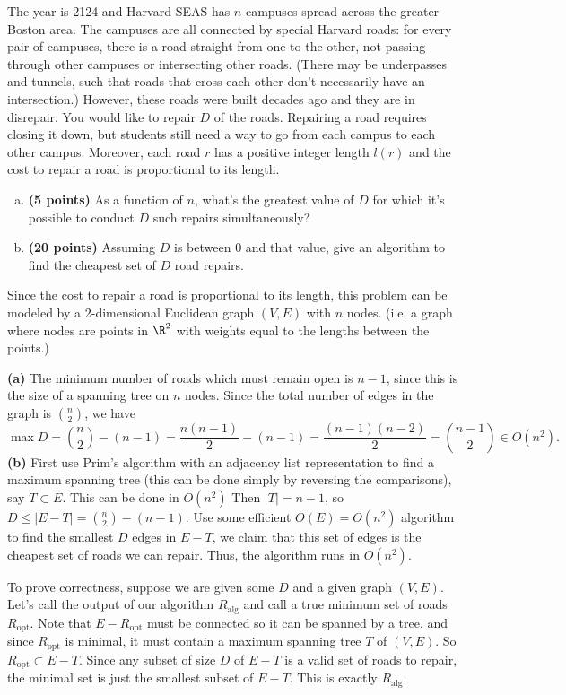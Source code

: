 \documentclass[11pt,letterpaper]{article}
\begin{document}
\pagebreak
\begin{problem}
    The year is 2124 and Harvard SEAS has $n$ campuses spread across the greater Boston area. The campuses are all connected by special Harvard roads: for every pair of campuses, there is a road straight from one to the other, not passing through other campuses or intersecting other roads. (There may be underpasses and tunnels, such that roads that cross each other don't necessarily have an intersection.) However, these roads were built decades ago and they are in disrepair. You would like to repair $D$ of the roads. Repairing a road requires closing it down, but students still need a way to go from each campus to each other campus. Moreover, each road $r$ has a positive integer length $l(r)$ and the cost to repair a road is proportional to its length. 

    \begin{enumerate}[(a)]
        \item  {\bf (5 points)}
        As a function of $n$, what's the greatest value of $D$ for which it's possible to conduct $D$ such repairs simultaneously?
        \item  {\bf (20 points)}
        Assuming $D$ is between 0 and that value, give an algorithm to find the cheapest set of $D$ road repairs.
    \end{enumerate}
\end{problem}

\begin{solution}
    Since the cost to repair a road is proportional to its length, this problem can be modeled by a 2-dimensional Euclidean graph $(V,E)$ with $n$ nodes. (i.e. a graph where nodes are points in $\R^2$ with weights equal to the lengths between the points.)

    \textbf{(a)} The minimum number of roads which must remain open is $n-1$, since this is the size of a spanning tree on $n$ nodes. Since the total number of edges in the graph is $\binom{n}{2}$, we have
    \[
        \max D = \binom{n}{2}-(n-1)=\frac{n(n-1)}{2}-(n-1)=\frac{(n-1)(n-2)}{2}=\binom{n-1}{2}\in O(n^2)
    .\] 
    \textbf{(b)} First use Prim's algorithm with an adjacency list representation to find a maximum spanning tree (this can be done simply by reversing the comparisons), say $T\subset E$. This can be done in $O(n^2)$  Then $|T|=n-1$, so $D\leq |E-T|=\binom{n}{2}-(n-1)$. Use some efficient $O(E)=O(n^2)$ algorithm to find the smallest $D$ edges in $E-T$, we claim that this set of edges is the cheapest set of roads we can repair. Thus, the algorithm runs in $O(n^2)$.

    To prove correctness, suppose we are given some $D$ and a given graph $(V,E)$. Let's call the output of our algorithm $R_{\mathrm{alg}}$ and call a true minimum set of roads $R_{\mathrm{opt}}$. Note that $E-R_{\mathrm{opt}}$ must be connected so it can be spanned by a tree, and since $R_{\mathrm{opt}}$ is minimal, it must contain a maximum spanning tree $T$ of $(V,E)$. So $R_{\mathrm{opt}}\subset E-T$. Since any subset of size $D$ of $E-T$ is a valid set of roads to repair, the minimal set is just the smallest subset of $E-T$. This is exactly $R_{\mathrm{alg}}$.
\end{solution}
\end{document}
